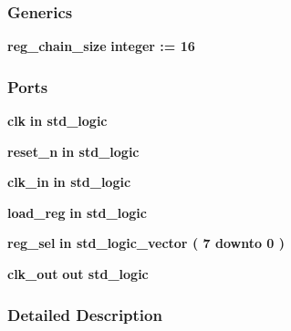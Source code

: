 \subsubsection*{Generics}
 \begin{DoxyCompactItemize}
\item 
{\bf reg\+\_\+chain\+\_\+size} {\bfseries {\bfseries \textcolor{comment}{integer}\textcolor{vhdlchar}{ }\textcolor{vhdlchar}{ }\textcolor{vhdlchar}{\+:}\textcolor{vhdlchar}{=}\textcolor{vhdlchar}{ }\textcolor{vhdlchar}{ } \textcolor{vhdldigit}{16} \textcolor{vhdlchar}{ }}}
\end{DoxyCompactItemize}
\subsubsection*{Ports}
 \begin{DoxyCompactItemize}
\item 
{\bf clk}  {\bfseries {\bfseries \textcolor{keywordflow}{in}\textcolor{vhdlchar}{ }}} {\bfseries \textcolor{comment}{std\+\_\+logic}\textcolor{vhdlchar}{ }} 
\item 
{\bf reset\+\_\+n}  {\bfseries {\bfseries \textcolor{keywordflow}{in}\textcolor{vhdlchar}{ }}} {\bfseries \textcolor{comment}{std\+\_\+logic}\textcolor{vhdlchar}{ }} 
\item 
{\bf clk\+\_\+in}  {\bfseries {\bfseries \textcolor{keywordflow}{in}\textcolor{vhdlchar}{ }}} {\bfseries \textcolor{comment}{std\+\_\+logic}\textcolor{vhdlchar}{ }} 
\item 
{\bf load\+\_\+reg}  {\bfseries {\bfseries \textcolor{keywordflow}{in}\textcolor{vhdlchar}{ }}} {\bfseries \textcolor{comment}{std\+\_\+logic}\textcolor{vhdlchar}{ }} 
\item 
{\bf reg\+\_\+sel}  {\bfseries {\bfseries \textcolor{keywordflow}{in}\textcolor{vhdlchar}{ }}} {\bfseries \textcolor{comment}{std\+\_\+logic\+\_\+vector}\textcolor{vhdlchar}{ }\textcolor{vhdlchar}{(}\textcolor{vhdlchar}{ }\textcolor{vhdlchar}{ } \textcolor{vhdldigit}{7} \textcolor{vhdlchar}{ }\textcolor{keywordflow}{downto}\textcolor{vhdlchar}{ }\textcolor{vhdlchar}{ } \textcolor{vhdldigit}{0} \textcolor{vhdlchar}{ }\textcolor{vhdlchar}{)}\textcolor{vhdlchar}{ }} 
\item 
{\bf clk\+\_\+out}  {\bfseries {\bfseries \textcolor{keywordflow}{out}\textcolor{vhdlchar}{ }}} {\bfseries \textcolor{comment}{std\+\_\+logic}\textcolor{vhdlchar}{ }} 
\end{DoxyCompactItemize}


\subsubsection{Detailed Description}


